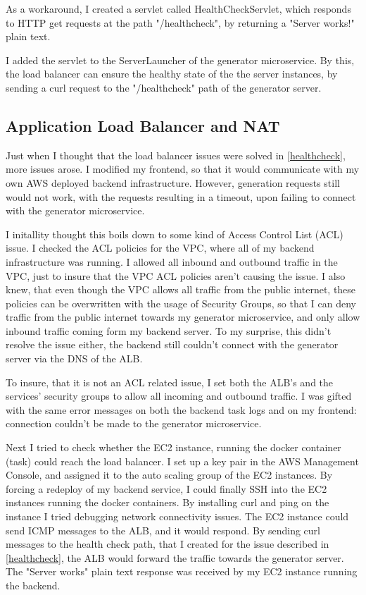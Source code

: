 		As a workaround, I created a servlet called HealthCheckServlet, which responds to HTTP get requests at the path "/healthcheck",
		by returning a "Server works!" plain text.

		I added the servlet to the ServerLauncher of the generator microservice. By this, the load balancer can ensure the healthy state of the 
		the server instances, by sending a curl request to the "/healthcheck" path of the generator server.

	\subsection{Application Load Balancer and NAT} \label{ALB NAT}
		Just when I thought that the load balancer issues were solved in \ref{healthcheck}, more issues arose. I modified my frontend,
		so that it would communicate with my own AWS deployed backend infrastructure. However, generation requests still would not 
		work, with the requests resulting in a timeout, upon failing to connect with the generator microservice.

		I initallity thought this boils down to some kind of Access Control List (ACL) issue. I checked the ACL policies for the VPC, where all
		of my backend infrastructure was running. I allowed all inbound and outbound traffic in the VPC, just to insure that the VPC ACL policies
		aren't causing the issue. I also knew, that even though the VPC allows all traffic from the public internet, these policies can be overwritten
		with the usage of Security Groups, so that I can deny traffic from the public internet towards my generator microservice, and only allow
		inbound traffic coming form my backend server. To my surprise, this didn't resolve the issue either, the backend still couldn't connect
		with the generator server via the DNS of the ALB.

		To insure, that it is not an ACL related issue, I set both the ALB's and the services' security groups to allow all incoming and outbound traffic.
		I was gifted with the same error messages on both the backend task logs
		and on my frontend: connection couldn't be made to the generator microservice.

		Next I tried to check whether the EC2 instance, running the docker container (task) could reach the load balancer. I set up a 
		key pair in the AWS Management Console, and assigned it to the auto scaling group of the EC2 instances. By forcing a redeploy of my 
		backend service, I could finally SSH into the EC2 instances running the docker containers. By installing curl and ping on the instance
		I tried debugging network connectivity issues. The EC2 instance could send ICMP messages to the ALB, and it would respond. By sending
		curl messages to the health check path, that I created for the issue described in \ref{healthcheck}, the ALB would forward the traffic
		towards the generator server. The "Server works" plain text response was received by my EC2 instance running the backend.


